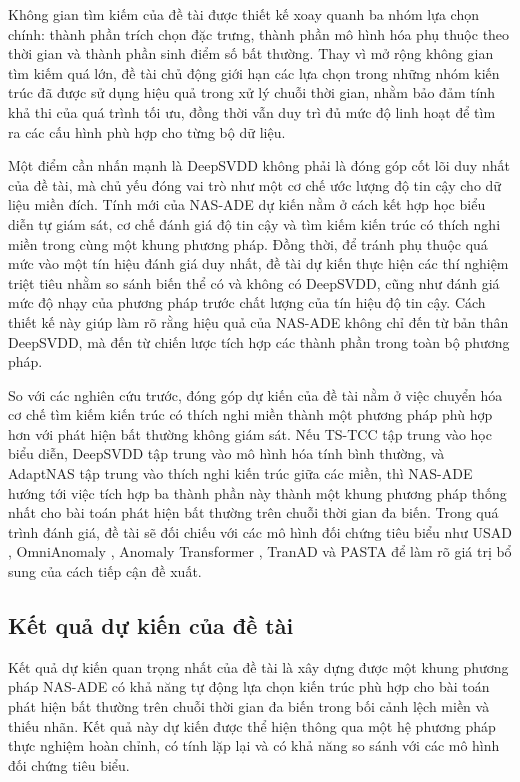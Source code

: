 \documentclass[a4paper]{article}
\begin{document}
Không gian tìm kiếm của đề tài được thiết kế xoay quanh ba nhóm lựa chọn chính: thành phần trích chọn đặc trưng, thành phần mô hình hóa phụ thuộc theo thời gian và thành phần sinh điểm số bất thường. Thay vì mở rộng không gian tìm kiếm quá lớn, đề tài chủ động giới hạn các lựa chọn trong những nhóm kiến trúc đã được sử dụng hiệu quả trong xử lý chuỗi thời gian, nhằm bảo đảm tính khả thi của quá trình tối ưu, đồng thời vẫn duy trì đủ mức độ linh hoạt để tìm ra các cấu hình phù hợp cho từng bộ dữ liệu.

Một điểm cần nhấn mạnh là DeepSVDD không phải là đóng góp cốt lõi duy nhất của đề tài, mà chủ yếu đóng vai trò như một cơ chế ước lượng độ tin cậy cho dữ liệu miền đích. Tính mới của NAS-ADE dự kiến nằm ở cách kết hợp học biểu diễn tự giám sát, cơ chế đánh giá độ tin cậy và tìm kiếm kiến trúc có thích nghi miền trong cùng một khung phương pháp. Đồng thời, để tránh phụ thuộc quá mức vào một tín hiệu đánh giá duy nhất, đề tài dự kiến thực hiện các thí nghiệm triệt tiêu nhằm so sánh biến thể có và không có DeepSVDD, cũng như đánh giá mức độ nhạy của phương pháp trước chất lượng của tín hiệu độ tin cậy. Cách thiết kế này giúp làm rõ rằng hiệu quả của NAS-ADE không chỉ đến từ bản thân DeepSVDD, mà đến từ chiến lược tích hợp các thành phần trong toàn bộ phương pháp.

So với các nghiên cứu trước, đóng góp dự kiến của đề tài nằm ở việc chuyển hóa cơ chế tìm kiếm kiến trúc có thích nghi miền thành một phương pháp phù hợp hơn với phát hiện bất thường không giám sát. Nếu TS-TCC \cite{tstcc} tập trung vào học biểu diễn, DeepSVDD \cite{deepsvdd} tập trung vào mô hình hóa tính bình thường, và AdaptNAS \cite{adaptnas} tập trung vào thích nghi kiến trúc giữa các miền, thì NAS-ADE hướng tới việc tích hợp ba thành phần này thành một khung phương pháp thống nhất cho bài toán phát hiện bất thường trên chuỗi thời gian đa biến. Trong quá trình đánh giá, đề tài sẽ đối chiếu với các mô hình đối chứng tiêu biểu như USAD \cite{usad}, OmniAnomaly \cite{omnianomaly}, Anomaly Transformer \cite{anomaly_transformer}, TranAD \cite{tranad} và PASTA \cite{pasta} để làm rõ giá trị bổ sung của cách tiếp cận đề xuất.

\subsection{Kết quả dự kiến của đề tài}

Kết quả dự kiến quan trọng nhất của đề tài là xây dựng được một khung phương pháp NAS-ADE có khả năng tự động lựa chọn kiến trúc phù hợp cho bài toán phát hiện bất thường trên chuỗi thời gian đa biến trong bối cảnh lệch miền và thiếu nhãn. Kết quả này dự kiến được thể hiện thông qua một hệ phương pháp thực nghiệm hoàn chỉnh, có tính lặp lại và có khả năng so sánh với các mô hình đối chứng tiêu biểu.
\end{document}
